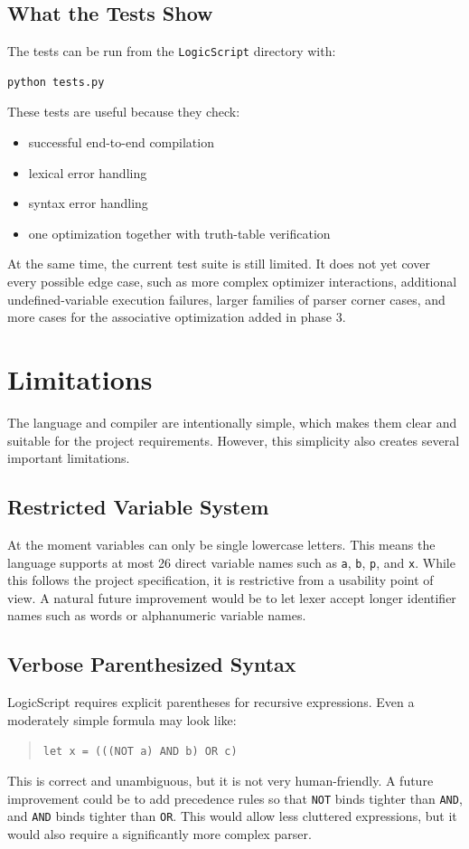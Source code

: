 \documentclass[11pt]{article}
\begin{document}
\subsection{What the Tests Show}
The tests can be run from the \texttt{LogicScript} directory with:
\begin{lstlisting}
python tests.py
\end{lstlisting}
These tests are useful because they check:
\begin{itemize}
    \item successful end-to-end compilation
    \item lexical error handling
    \item syntax error handling
    \item one optimization together with truth-table verification
\end{itemize}
At the same time, the current test suite is still limited. It does not yet cover every possible edge case, such as more complex optimizer interactions, additional undefined-variable execution failures, larger families of parser corner cases, and more cases for the associative optimization added in phase 3.

\section{Limitations}
The language and compiler are intentionally simple, which makes them clear and suitable for the project requirements. However, this simplicity also creates several important limitations.

\subsection{Restricted Variable System}
At the moment variables can only be single lowercase letters. This means the language supports at most 26 direct variable names such as \texttt{a}, \texttt{b}, \texttt{p}, and \texttt{x}. While this follows the project specification, it is restrictive from a usability point of view. A natural future improvement would be to let lexer accept longer identifier names such as words or alphanumeric variable names.

\subsection{Verbose Parenthesized Syntax}
LogicScript requires explicit parentheses for recursive expressions. Even a moderately simple formula may look like:
\begin{quote}
\texttt{let x = (((NOT a) AND b) OR c)}
\end{quote}
This is correct and unambiguous, but it is not very human-friendly. A future improvement could be to add precedence rules so that \texttt{NOT} binds tighter than \texttt{AND}, and \texttt{AND} binds tighter than \texttt{OR}. This would allow less cluttered expressions, but it would also require a significantly more complex parser.
\end{document}
